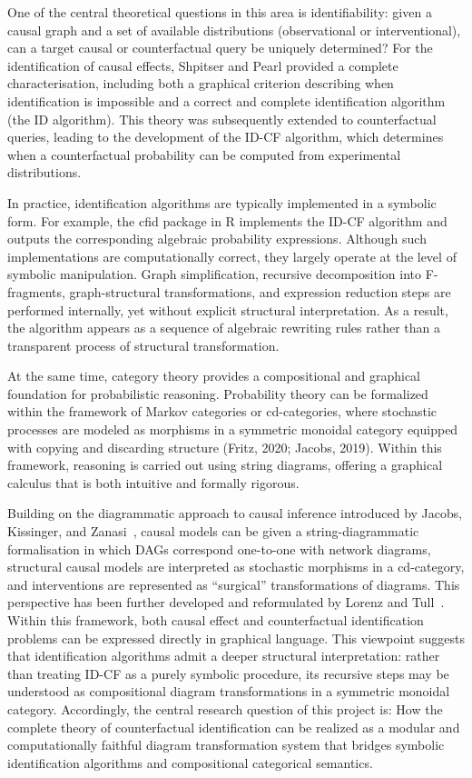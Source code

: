 \documentclass[a4paper]{report}
\begin{document}
One of the central theoretical questions in this area is identifiability: given a causal graph and a set of available distributions (observational or interventional), can a target causal or counterfactual query be uniquely determined? For the identification of causal effects, Shpitser and Pearl \cite{shpitser2008complete} provided a complete characterisation, including both a graphical criterion describing when identification is impossible and a correct and complete identification algorithm (the ID algorithm). This theory was subsequently extended to counterfactual queries, leading to the development of the ID-CF algorithm, which determines when a counterfactual probability can be computed from experimental distributions.

In practice, identification algorithms are typically implemented in a symbolic form. For example, the cfid package in R implements the ID-CF algorithm and outputs the corresponding algebraic probability expressions. Although such implementations are computationally correct, they largely operate at the level of symbolic manipulation. Graph simplification, recursive decomposition into F-fragments, graph-structural transformations, and expression reduction steps are performed internally, yet without explicit structural interpretation. As a result, the algorithm appears as a sequence of algebraic rewriting rules rather than a transparent process of structural transformation.

At the same time, category theory provides a compositional and graphical foundation for probabilistic reasoning. Probability theory can be formalized within the framework of Markov categories or cd-categories, where stochastic processes are modeled as morphisms in a symmetric monoidal category equipped with copying and discarding structure (Fritz, 2020; Jacobs, 2019). Within this framework, reasoning is carried out using string diagrams, offering a graphical calculus that is both intuitive and formally rigorous.

Building on the diagrammatic approach to causal inference introduced by Jacobs, Kissinger, and Zanasi~\cite{jacobs2019causal, DBLP:journals/mscs/JacobsKZ21}, causal models can be given a string-diagrammatic formalisation in which DAGs correspond one-to-one with network diagrams, structural causal models are interpreted as stochastic morphisms in a cd-category, and interventions are represented as “surgical” transformations of diagrams. This perspective has been further developed and reformulated by Lorenz and Tull~\cite{lorenz2023causal}. Within this framework, both causal effect and counterfactual identification problems can be expressed directly in graphical language. This viewpoint suggests that identification algorithms admit a deeper structural interpretation: rather than treating ID-CF as a purely symbolic procedure, its recursive steps may be understood as compositional diagram transformations in a symmetric monoidal category. Accordingly, the central research question of this project is: How the complete theory of counterfactual identification can be realized as a modular and computationally faithful diagram transformation system that bridges symbolic identification algorithms and compositional categorical semantics.
\end{document}

